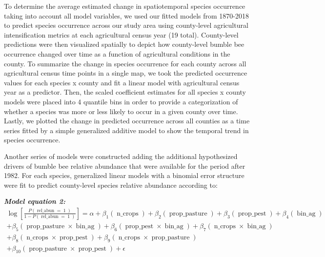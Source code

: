 \documentclass[11pt,]{article}
\begin{document}
To determine the average estimated change in spatiotemporal species
occurrence taking into account all model variables, we used our fitted
models from 1870-2018 to predict species occurrence across our study
area using county-level agricultural intensification metrics at each
agricultural census year (19 total). County-level predictions were then
visualized spatially to depict how county-level bumble bee occurrence
changed over time as a function of agricultural conditions in the
county. To summarize the change in species occurrence for each county
across all agricultural census time points in a single map, we took the
predicted occurrence values for each species x county and fit a linear
model with agricultural census year as a predictor. Then, the scaled
coefficient estimates for all species x county models were placed into 4
quantile bins in order to provide a categorization of whether a species
was more or less likely to occur in a given county over time. Lastly, we
plotted the change in predicted occurrence across all counties as a time
series fitted by a simple generalized additive model to show the
temporal trend in species occurrence.

Another series of models were constructed adding the additional
hypothesized drivers of bumble bee relative abundance that were
available for the period after 1982. For each species, generalized
linear models with a binomial error structure were fit to predict
county-level species relative abundance according to:

\emph{\textbf{Model equation 2:}} \[
\begin{aligned} \log\left[ \frac { P( \operatorname{rel\_abun} = \operatorname{1} ) }{ 1 - P( \operatorname{rel\_abun} = \operatorname{1} ) } \right] = \alpha + \beta_{1}(\operatorname{n\_crops}) + \beta_{2}(\operatorname{prop\_pasture}) + \beta_{3}(\operatorname{prop\_pest}) + \beta_{4}(\operatorname{bin\_ag})\\ + \beta_{5}(\operatorname{prop\_pasture} \times \operatorname{bin\_ag}) + \beta_{6}(\operatorname{prop\_pest} \times \operatorname{bin\_ag}) + \beta_{7}(\operatorname{n\_crops} \times \operatorname{bin\_ag})\\ + \beta_{8}(\operatorname{n\_crops} \times \operatorname{prop\_pest}) + \beta_{9}(\operatorname{n\_crops} \times \operatorname{prop\_pasture})\\ + \beta_{10}(\operatorname{prop\_pasture} \times \operatorname{prop\_pest}) + \epsilon \end{aligned}
\]
\end{document}
